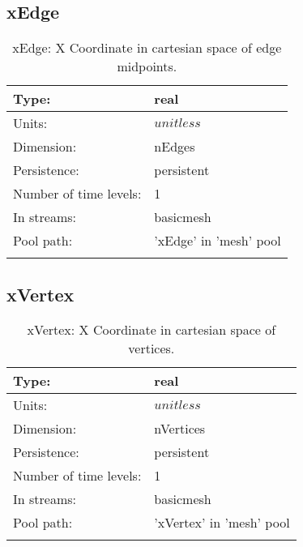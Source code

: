 \subsection[xEdge]{xEdge}
\label{subsec:var_sec_mesh_xEdge}
\begin{center}
\begin{longtable}{| p{2.0in} | p{4.0in} |}
        \hline 
        Type: & real \\
        \hline 
        Units: & $unitless$ \\
        \hline 
        Dimension: & nEdges \\
        \hline 
        Persistence: & persistent \\
        \hline 
        Number of time levels: & 1 \\
        \hline 
		 In streams: &  basicmesh \\
        \hline 
            Pool path: & 'xEdge' in 'mesh' pool
 \\
		 \hline 
    \caption{xEdge: X Coordinate in cartesian space of edge midpoints.}
\end{longtable}
\end{center}
\subsection[xVertex]{xVertex}
\label{subsec:var_sec_mesh_xVertex}
\begin{center}
\begin{longtable}{| p{2.0in} | p{4.0in} |}
        \hline 
        Type: & real \\
        \hline 
        Units: & $unitless$ \\
        \hline 
        Dimension: & nVertices \\
        \hline 
        Persistence: & persistent \\
        \hline 
        Number of time levels: & 1 \\
        \hline 
		 In streams: &  basicmesh \\
        \hline 
            Pool path: & 'xVertex' in 'mesh' pool
 \\
		 \hline 
    \caption{xVertex: X Coordinate in cartesian space of vertices.}
\end{longtable}
\end{center}
